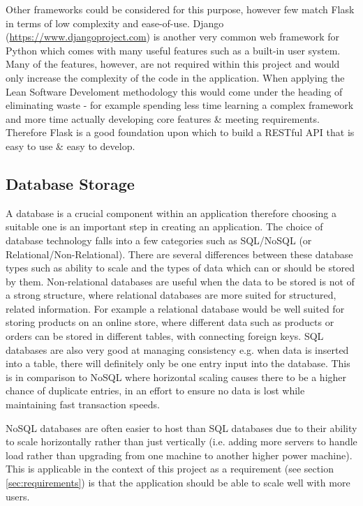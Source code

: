 \documentclass[a4paper,12pt]{report}
\begin{document}
      Other frameworks could be considered for this purpose, however few match Flask in terms of low complexity and ease-of-use. Django (\url{https://www.djangoproject.com}) is another very common web framework for Python which comes with many useful features such as a built-in user system. Many of the features, however, are not required within this project and would only increase the complexity of the code in the application. When applying the Lean Software Develoment methodology \citep{poppendieck2003lean} this would come under the heading of eliminating waste - for example spending less time learning a complex framework and more time actually developing core features \& meeting requirements. Therefore Flask is a good foundation upon which to build a RESTful API that is easy to use \& easy to develop.

    \subsection{Database Storage} %
      A database is a crucial component within an application therefore choosing a suitable one is an important step in creating an application. The choice of database technology falls into a few categories such as SQL/NoSQL (or Relational/Non-Relational). There are several differences between these database types such as ability to scale and the types of data which can or should be stored by them. Non-relational databases are useful when the data to be stored is not of a strong structure, where relational databases are more suited for structured, related information. For example a relational database would be well suited for storing products on an online store, where different data such as products or orders can be stored in different tables, with connecting foreign keys. SQL databases are also very good at managing consistency e.g. when data is inserted into a table, there will definitely only be one entry input into the database. This is in comparison to NoSQL where horizontal scaling causes there to be a higher chance of duplicate entries, in an effort to ensure no data is lost while maintaining fast transaction speeds.

      NoSQL databases are often easier to host than SQL databases due to their ability to scale horizontally \citep{cattell2011scalable} rather than just vertically (i.e. adding more servers to handle load rather than upgrading from one machine to another higher power machine). This is applicable in the context of this project as a requirement (see section \ref{sec:requirements}) is that the application should be able to scale well with more users.
\end{document}
